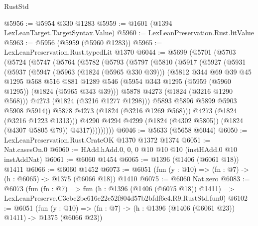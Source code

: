 \begin{lexlean}{RustStd}
\begin{coremodule}
@5956 := @5954 @330 @1283
@5959 := @1601 (@1394 LexLeanTarget.TargetSyntax.Value)
@5960 := LexLeanPreservation.Rust.litValue
@5963 := @5956 (@5959 (@5960 @1283))
@5965 := LexLeanPreservation.Rust.typedLit @1370
@6044 := @5699
    (@5701
      (@5703
        (@5724
          (@5747
            (@5764
              (@5782
                (@5793
                  (@5797
                    (@5810
                      (@5917
                        (@5927
                          (@5931
                            (@5937
                              (@5947
                                (@5963 (@1824 (@5965 @330 @39)))
                                (@5812
                                  @344
                                  @69
                                  @39
                                  @45
                                  @1295
                                  @568
                                  @516
                                  @881
                                  @1289
                                  @546
                                  (@5954 @343 @1295 (@5959 (@5960 @1295)) (@1824 (@5965 @343 @39)))
                                  @5878
                                  @4273
                                  (@1824 (@3216 @1290 @568)))
                                @4273
                                (@1824 (@3216 @1277 @1298)))
                              @5893
                              @5896
                              @5899
                              @5903
                              @5908
                              @5914))
                          @5878
                          @4273
                          (@1824 (@3216 @1269 @568)))
                        @4273
                        (@1824 (@3216 @1223 @1313)))
                      @4290
                      @4294
                      @4299
                      (@1824 (@4302 @5805))
                      (@1824 (@4307 @5805 @79))
                      @4317)))))))))
@6046 := @5633 (@5658 @6044)
@6050 := LexLeanPreservation.Rust.CrateOK @1370 @1372 @1374
@6051 := Nat.casesOn.{0}
@6060 := HAdd.hAdd.{0, 0, 0} @10 @10 @10 (instHAdd.{0} @10 instAddNat)
@6061 := @6060 @1454
@6065 := @1396 (@1406 (@6061 @18)) @1411
@6066 := @6060 @1452
@6073 := @6051 (fun (y : @10) => (fn : @7) -> (h : @6065) -> @1375 (@6066 @18)) @1410
@6075 := @6060 Nat.zero
@6083 := @6073
    (fun (fn : @7) =>
    fun (h : @1396 (@1406 (@6075 @18)) @1411) =>
    LexLeanPreserve.C3ebc2be616e22c52f804d57b2bfdf6e4.R9.RustStd.fun0)
@6102 := @6051
    (fun (y : @10) => (fn : @7) -> (h : @1396 (@1406 (@6061 @23)) @1411) -> @1375 (@6066 @23))

\end{coremodule}
\end{lexlean}
